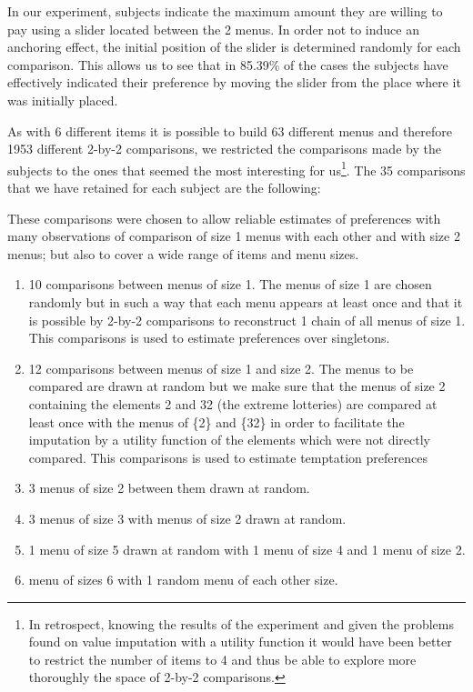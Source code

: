 \documentclass[
]{book}
\providecommand{\tightlist}{%
  \setlength{\itemsep}{0pt}\setlength{\parskip}{0pt}}
\begin{document}
In our experiment, subjects indicate the maximum amount they are willing to pay
using a slider located between the 2 menus.
In order not to induce an anchoring effect, the initial position of the slider
is determined randomly for each comparison.
This allows us to see that in 85.39\% of the
cases the subjects have effectively indicated their preference by moving the
slider from the place where it was initially placed.

As with 6 different items it is possible to build 63 different menus and
therefore 1953 different 2-by-2 comparisons, we restricted the comparisons made
by the subjects to the ones that seemed the most interesting for us\footnote{In retrospect, knowing the results of the experiment and given the problems found on value
  imputation with a utility function it would have been better to restrict the
  number of items to 4 and thus be able to explore more thoroughly the space of 2-by-2 comparisons.}.
The 35 comparisons that we have retained for each subject are the following:

These comparisons were chosen to allow reliable estimates of preferences with many
observations of comparison of size 1 menus with each other and with size 2
menus;
but also to cover a wide range of items and menu sizes.

\begin{enumerate}
\def\labelenumi{\arabic{enumi}.}
\tightlist
\item
  10 comparisons between menus of size 1.
  The menus of size 1 are chosen randomly but in such a way that each menu appears
  at least once and that it is possible by 2-by-2 comparisons to reconstruct 1
  chain of all menus of size 1.
  This comparisons is used to estimate preferences over singletons.
\item
  12 comparisons between menus of size 1 and size 2.
  The menus to be compared are drawn at random but we make sure that the menus of
  size 2 containing the elements 2 and 32 (the extreme lotteries) are compared at
  least once with the menus of \{2\} and \{32\} in order to facilitate the imputation
  by a utility function of the elements which were not directly compared.
  This comparisons is used to estimate temptation preferences
\item
  3 menus of size 2 between them drawn at random.
\item
  3 menus of size 3 with menus of size 2 drawn at random.
\item
  1 menu of size 5 drawn at random with 1 menu of size 4 and 1 menu of size 2.
\item
  menu of sizes 6 with 1 random menu of each other size.
\end{enumerate}
\end{document}
